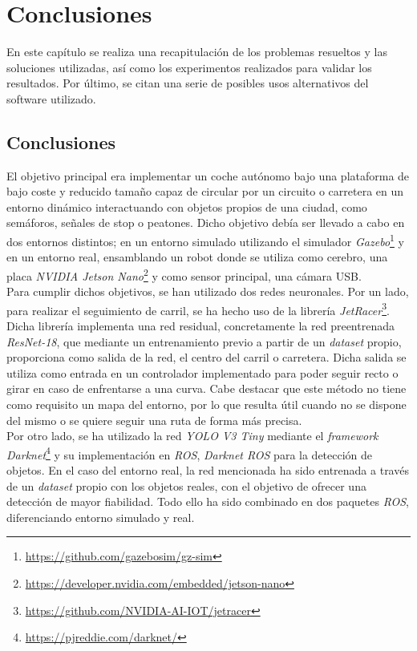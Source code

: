 \chapter{Conclusiones}
\label{cap:capitulo5}
En este capítulo se realiza una recapitulación de los problemas resueltos y las soluciones utilizadas, así como los experimentos realizados para validar los resultados. Por último, se citan una serie de posibles usos alternativos del software utilizado.

\section{Conclusiones}
\label{section:conclusiones}
El objetivo principal era implementar un coche autónomo bajo una plataforma de bajo coste y reducido tamaño capaz de circular por un circuito o carretera en un entorno dinámico interactuando con objetos propios de una ciudad, como semáforos, señales de stop o peatones. Dicho objetivo debía ser llevado a cabo en dos entornos distintos; en un entorno simulado utilizando el simulador \textit{Gazebo}\footnote{\url{https://github.com/gazebosim/gz-sim}} y en un entorno real, ensamblando un robot donde se utiliza como cerebro, una placa \textit{NVIDIA Jetson Nano}\footnote{\url{https://developer.nvidia.com/embedded/jetson-nano}} y como sensor principal, una cámara USB.\\

Para cumplir dichos objetivos, se han utilizado dos redes neuronales. Por un lado, para realizar el seguimiento de carril, se ha hecho uso de la librería \textit{JetRacer}\footnote{\url{https://github.com/NVIDIA-AI-IOT/jetracer}}. Dicha librería implementa una red residual, concretamente la red preentrenada \textit{ResNet-18}, que mediante un entrenamiento previo a partir de un \textit{dataset} propio, proporciona como salida de la red, el centro del carril o carretera. Dicha salida se utiliza como entrada en un controlador implementado para poder seguir recto o girar en caso de enfrentarse a una curva. Cabe destacar que este método no tiene como requisito un mapa del entorno, por lo que resulta útil cuando no se dispone del mismo o se quiere seguir una ruta de forma más precisa.\\

Por otro lado, se ha utilizado la red \textit{YOLO V3 Tiny} mediante el \textit{framework} \textit{Darknet}\footnote{\url{https://pjreddie.com/darknet/}} y su implementación en \textit{ROS}, \textit{Darknet ROS} para la detección de objetos. En el caso del entorno real, la red mencionada ha sido entrenada a través de un \textit{dataset} propio con los objetos reales, con el objetivo de ofrecer una detección de mayor fiabilidad. 
Todo ello ha sido combinado en dos paquetes \textit{ROS}, diferenciando entorno simulado y real.\\

